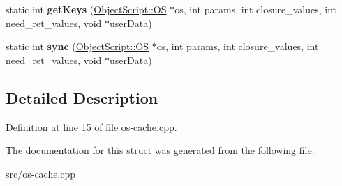 \begin{DoxyCompactItemize}
\item 
static int {\bfseries get\+Keys} (\hyperlink{class_object_script_1_1_o_s}{Object\+Script\+::\+OS} $\ast$os, int params, int closure\+\_\+values, int need\+\_\+ret\+\_\+values, void $\ast$user\+Data)\hypertarget{struct_o_s_file_cache_a67e2e8066a1f093df1adfe932129cabe}{}\label{struct_o_s_file_cache_a67e2e8066a1f093df1adfe932129cabe}

\item 
static int {\bfseries sync} (\hyperlink{class_object_script_1_1_o_s}{Object\+Script\+::\+OS} $\ast$os, int params, int closure\+\_\+values, int need\+\_\+ret\+\_\+values, void $\ast$user\+Data)\hypertarget{struct_o_s_file_cache_a154892cb206b032894ab0ca43b2d09fc}{}\label{struct_o_s_file_cache_a154892cb206b032894ab0ca43b2d09fc}

\end{DoxyCompactItemize}


\subsection{Detailed Description}


Definition at line 15 of file os-\/cache.\+cpp.



The documentation for this struct was generated from the following file\+:\begin{DoxyCompactItemize}
\item 
src/os-\/cache.\+cpp\end{DoxyCompactItemize}
